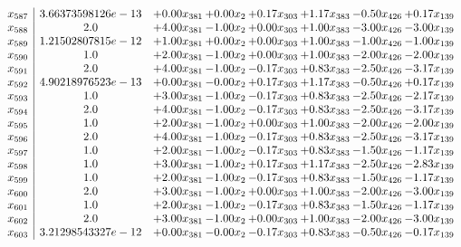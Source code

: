 \documentclass[8pt]{article}
\begin{document}
\[\begin{array}{c| c c@{\hskip 2pt} c@{\hskip 2pt} c@{\hskip 2pt} c@{\hskip 2pt} c@{\hskip 2pt} c@{\hskip 2pt} }
 x_{587}   &  3.66373598126e-13 & +  0.00 x_{381} & +  0.00 x_{2} & +  0.17 x_{303} & +  1.17 x_{383} & -0.50 x_{426} & +  0.17 x_{139}\\
 x_{588}   &  2.0 & +  4.00 x_{381} & -1.00 x_{2} & +  0.00 x_{303} & +  1.00 x_{383} & -3.00 x_{426} & -3.00 x_{139}\\
 x_{589}   &  1.21502807815e-12 & +  1.00 x_{381} & +  0.00 x_{2} & +  0.00 x_{303} & +  1.00 x_{383} & -1.00 x_{426} & -1.00 x_{139}\\
 x_{590}   &  1.0 & +  2.00 x_{381} & -1.00 x_{2} & +  0.00 x_{303} & +  1.00 x_{383} & -2.00 x_{426} & -2.00 x_{139}\\
 x_{591}   &  2.0 & +  4.00 x_{381} & -1.00 x_{2} & -0.17 x_{303} & +  0.83 x_{383} & -2.50 x_{426} & -3.17 x_{139}\\
 x_{592}   &  4.90218976523e-13 & +  0.00 x_{381} & -0.00 x_{2} & +  0.17 x_{303} & +  1.17 x_{383} & -0.50 x_{426} & +  0.17 x_{139}\\
 x_{593}   &  1.0 & +  3.00 x_{381} & -1.00 x_{2} & -0.17 x_{303} & +  0.83 x_{383} & -2.50 x_{426} & -2.17 x_{139}\\
 x_{594}   &  2.0 & +  4.00 x_{381} & -1.00 x_{2} & -0.17 x_{303} & +  0.83 x_{383} & -2.50 x_{426} & -3.17 x_{139}\\
 x_{595}   &  1.0 & +  2.00 x_{381} & -1.00 x_{2} & +  0.00 x_{303} & +  1.00 x_{383} & -2.00 x_{426} & -2.00 x_{139}\\
 x_{596}   &  2.0 & +  4.00 x_{381} & -1.00 x_{2} & -0.17 x_{303} & +  0.83 x_{383} & -2.50 x_{426} & -3.17 x_{139}\\
 x_{597}   &  1.0 & +  2.00 x_{381} & -1.00 x_{2} & -0.17 x_{303} & +  0.83 x_{383} & -1.50 x_{426} & -1.17 x_{139}\\
 x_{598}   &  1.0 & +  3.00 x_{381} & -1.00 x_{2} & +  0.17 x_{303} & +  1.17 x_{383} & -2.50 x_{426} & -2.83 x_{139}\\
 x_{599}   &  1.0 & +  2.00 x_{381} & -1.00 x_{2} & -0.17 x_{303} & +  0.83 x_{383} & -1.50 x_{426} & -1.17 x_{139}\\
 x_{600}   &  2.0 & +  3.00 x_{381} & -1.00 x_{2} & +  0.00 x_{303} & +  1.00 x_{383} & -2.00 x_{426} & -3.00 x_{139}\\
 x_{601}   &  1.0 & +  2.00 x_{381} & -1.00 x_{2} & -0.17 x_{303} & +  0.83 x_{383} & -1.50 x_{426} & -1.17 x_{139}\\
 x_{602}   &  2.0 & +  3.00 x_{381} & -1.00 x_{2} & +  0.00 x_{303} & +  1.00 x_{383} & -2.00 x_{426} & -3.00 x_{139}\\
 x_{603}   &  3.21298543327e-12 & +  0.00 x_{381} & -0.00 x_{2} & -0.17 x_{303} & +  0.83 x_{383} & -0.50 x_{426} & -0.17 x_{139}\\

\end{array}\]
\end{document}
